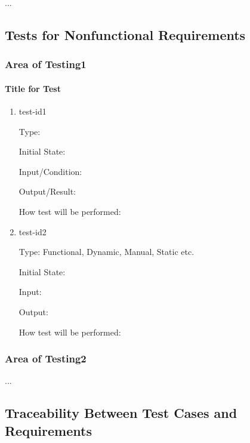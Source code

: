 \documentclass[12pt, titlepage]{article}
\begin{document}
...

\subsection{Tests for Nonfunctional Requirements}



\subsubsection{Area of Testing1}
		
\paragraph{Title for Test}

\begin{enumerate}

\item{test-id1\\}

Type: 
					
Initial State: 
					
Input/Condition: 
					
Output/Result: 
					
How test will be performed: 
					
\item{test-id2\\}

Type: Functional, Dynamic, Manual, Static etc.
					
Initial State: 
					
Input: 
					
Output: 
					
How test will be performed: 

\end{enumerate}

\subsubsection{Area of Testing2}

...

\subsection{Traceability Between Test Cases and Requirements}
\end{document}
